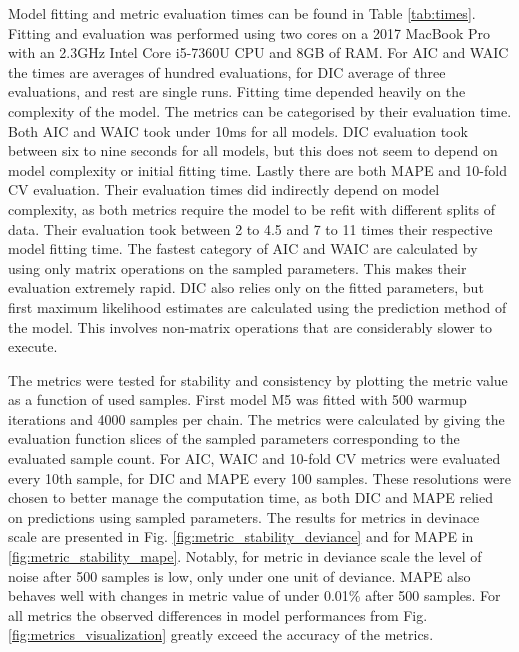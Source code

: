 \documentclass[english, 12pt, a4paper, sci, utf8, a-1b, online]{aaltothesis}
\begin{document}
Model fitting and metric evaluation times can be found in Table \ref{tab:times}. Fitting and evaluation was performed using two cores on a 2017 MacBook Pro with an 2.3GHz Intel Core i5-7360U CPU and 8GB of RAM. For AIC and WAIC the times are averages of hundred evaluations, for DIC average of three evaluations, and rest are single runs. Fitting time depended heavily on the complexity of the model. The metrics can be categorised by their evaluation time. Both AIC and WAIC took under 10ms for all models. DIC evaluation took between six to nine seconds for all models, but this does not seem to depend on model complexity or initial fitting time. Lastly there are both MAPE and 10-fold CV evaluation. Their evaluation times did indirectly depend on model complexity, as both metrics require the model to be refit with different splits of data. Their evaluation took between 2 to 4.5 and 7 to 11 times their respective model fitting time. The fastest category of AIC and WAIC are calculated by using only matrix operations on the sampled parameters. This makes their evaluation extremely rapid. DIC also relies only on the fitted parameters, but first maximum likelihood estimates are calculated using the prediction method of the model. This involves non-matrix operations that are considerably slower to execute. 



The metrics were tested for stability and consistency by plotting the metric value as a function of used samples. First model M5 was fitted with 500 warmup iterations and 4000 samples per chain. The metrics were calculated by giving the evaluation function slices of the sampled parameters corresponding to the evaluated sample count. For AIC, WAIC and 10-fold CV metrics were evaluated every 10th sample, for DIC and MAPE every 100 samples. These resolutions were chosen to better manage the computation time, as both DIC and MAPE relied on predictions using sampled parameters. The results for metrics in devinace scale are presented in Fig. \ref{fig:metric_stability_deviance} and for MAPE in \ref{fig:metric_stability_mape}. Notably, for metric in deviance scale the level of noise after 500 samples is low, only under one unit of deviance. MAPE also behaves well with changes in metric value of under 0.01\% after 500 samples. For all metrics the observed differences in model performances from Fig. \ref{fig:metrics_visualization} greatly exceed the accuracy of the metrics.
\end{document}
